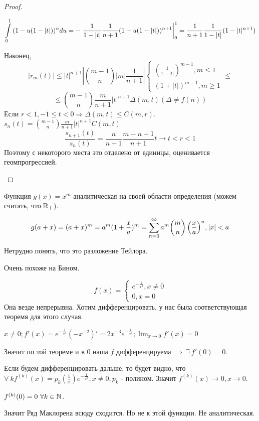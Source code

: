 \documentclass[12pt]{report}
\begin{document}
\begin{proof}
\begin{enumerate}
$$\int\limits_0^1{(1 - u(1 - |t|))^ndu} = -\left.\frac{1}{1 - |t|}\frac{1}{n + 1}(1 - u(1 - |t|))^{n + 1}\right|_0^1 = \frac{1}{n + 1}\frac{1}{1 - |t|}(1 - |t|^{n + 1})$$

Наконец, 
$$|r_m(t)| \le |t|^{n + 1}\left|\binom{m - 1}{n}|m|\frac{1}{n + 1}\right| \left\{\begin{matrix}
(\frac{1}{1 - |t|})^{m - 1}, m \le 1\\
(1 + |t|)^{m - 1}, m \ge 1
\end{matrix}\right. \le $$ $$\le \binom{m - 1}{n}\frac{m}{n + 1}|t|^{n + 1}\Delta(m, t) (\Delta \neq f(n))$$
Если $r < 1, - 1 \le t < 0 \Rightarrow \Delta(m, t) \le C(m , r)$. $s_n(t) = \binom{m - 1}{n}\frac{m}{n + 1}|t|^{n + 1}C(m, t)$
$$\frac{s_{n + 1}(t)}{s_n(t)} = \frac{n}{n + 1}\frac{m - n + 1}{n + 1}t \to t < r < 1$$
Поэтому с некоторого места это отделено от единицы, оценивается геомпрогрессией.
\end{enumerate}
\end{proof}

\begin{note}
Функция $g(x) = x^m$ аналитическая на своей области определения (можем считать, что $\mathbb{R}_{+}$).

$$g(a + x) = (a + x)^m = a^m(1 + \frac{x}{a})^m = \sum\limits_{n = 0}^\infty{a^m\binom{m}{n}\left(\frac{x}{a}\right)^n}, |x| < a$$

Нетрудно понять, что это разложение Тейлора.

Очень похоже на Бином.
\end{note}

\begin{ex}
$$f(x) = \left\{
\begin{matrix}
e^{-\frac{1}{x^2}}, x \neq 0\\
0, x = 0
\end{matrix}\right.
$$
Она везде непрерывна. Хотим дифференцировать, у нас была соответствующая теоремя для этого случая.

$x \neq 0; f'(x) = e^{-\frac{1}{x^2}}(-x^{-2})' = 2x^{-3}e^{-\frac{1}{x^2}}; \lim_{x \to 0}{f'(x)} = 0$

Значит по той теореме и в $0$ наша $f$ дифференцируема $\Rightarrow ~\exists ~f'(0) = 0$. 

Если будем дифференцировать дальше, то будет видно, что $\forall ~k f^{(k)}(x) = p_k(\frac{1}{x})e^{-\frac{1}{x^2}}, x \neq 0, p_k$ - полином. Значит $f^{(k)}(x) \to 0, x \to 0$.

$f^{(k)}(0) = 0 ~\forall k \in \mathbb{N}$.

Значит Ряд Маклорена всюду сходится. Но не к этой функции. Не аналитическая.
\end{ex}
\end{document}
